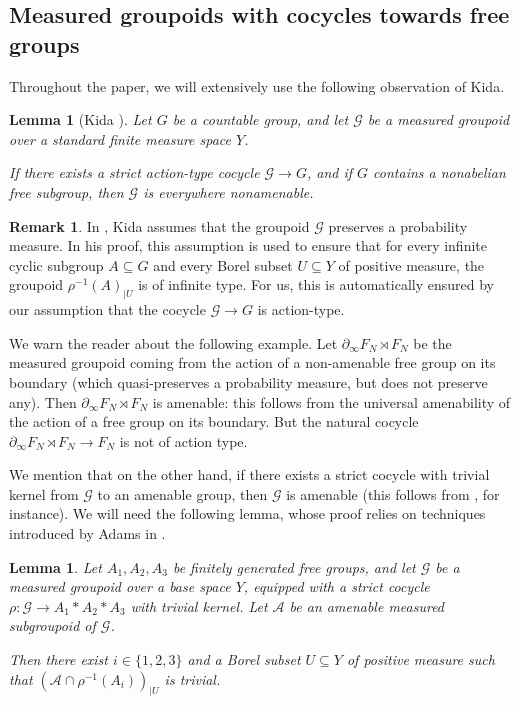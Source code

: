 \documentclass[11pt]{article}
\numberwithin{equation}{section}
\let\mathcal\mathscr
\theoremstyle{plain}
\newtheorem{lemma}[theo]{Lemma}
\theoremstyle{definition}
\newtheorem{rk}[theo]{Remark}
\newcommand{\cala}{\mathcal{A}}
\newcommand{\calg}{\mathcal{G}}
\begin{document}
\subsection{Measured groupoids with cocycles towards free groups}

Throughout the paper, we will extensively use the following observation of Kida.

\begin{lemma}[{Kida \cite[Lem.\,3.20]{Kid}}]\label{lemma:everywhere-nonamenable}
Let $G$ be a countable group, and let $\calg$ be a measured groupoid over a standard finite measure space $Y$.

If there exists a strict action-type cocycle $\calg\to G$, and if $G$ contains a nonabelian free subgroup, then $\calg$ is everywhere nonamenable.
\end{lemma}

\begin{rk}\label{rk:action-type}
In \cite[Lem.\,3.20]{Kid}, Kida assumes that the groupoid $\calg$ preserves a probability measure. In his proof, this assumption is used to ensure that for every infinite cyclic subgroup $A\subseteq G$ and every Borel subset $U\subseteq Y$ of positive measure, the groupoid $\rho^{-1}(A)_{|U}$ is of infinite type. For us, this is automatically ensured by our assumption that the cocycle $\calg\to G$ is action-type.

We warn the reader about the following example. Let $\partial_\infty F_N\rtimes F_N$ be the measured groupoid coming from the action of a non-amenable free group on its boundary (which quasi-preserves a probability measure, but does not preserve any). Then $\partial_\infty F_N\rtimes F_N$ is amenable: this follows from the universal amenability of the action of a free group on its boundary. But the natural cocycle $\partial_\infty F_N\rtimes F_N\to F_N$ is not of action type.
\end{rk}

We mention that on the other hand, if there exists a strict cocycle with trivial kernel from $\calg$ to an amenable group, then $\calg$ is amenable (this follows from \cite[Prop.\,4.33]{Kid-memoir}, for instance). We will need the following lemma, whose proof relies on techniques introduced by Adams in \cite{Ada}.

\begin{lemma}\label{lemma:free}
Let $A_1,A_2,A_3$ be finitely generated free groups, and let $\calg$ be a measured groupoid over a base space $Y$, equipped with a strict cocycle $\rho:\calg\to A_1\ast A_2\ast A_3$ with trivial kernel. Let $\cala$ be an amenable measured subgroupoid of $\calg$.

Then there exist $i\in\{1,2,3\}$ and a Borel subset $U\subseteq Y$ of positive measure such that $(\cala\cap \rho^{-1}(A_i))_{|U}$ is trivial.
\end{lemma}
\end{document}
